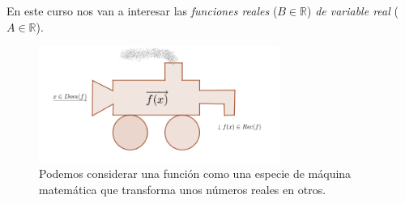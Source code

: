 		 En este curso nos van a interesar las \emph{funciones reales} ($B \in \mathbb R$) \emph{de variable real} ($A \in \mathbb R$).
	
	
	\begin{figure}[H]
		\centering
		\includegraphics[width=0.7\textwidth]{imagenes/imagenes02/T02IM01b.png}
		\caption{Podemos considerar una función como una especie de máquina matemática que transforma unos números reales en otros.}
	\end{figure}
	

